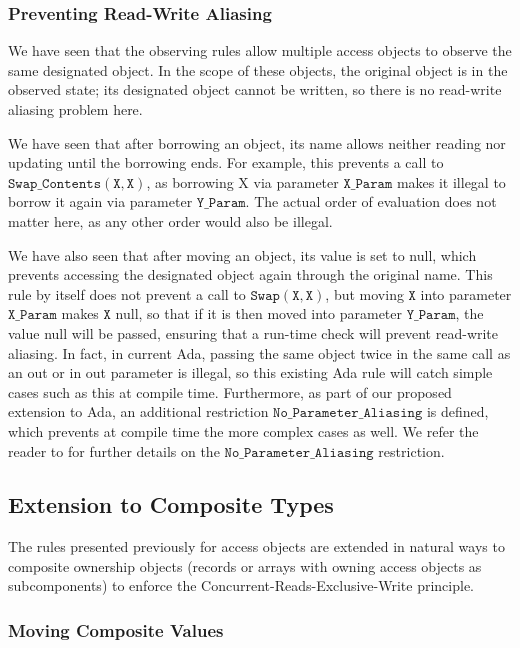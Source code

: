 \documentclass[runningheads]{llncs}
\newcommand\var[1]{\ensuremath{\mathtt{#1}}}
\newcommand{\keyword}[1]{\textsf{#1}}
\begin{document}
\subsubsection{Preventing Read-Write Aliasing}
\label{sec:noaliasing}

We have seen that the observing rules allow multiple access objects to observe the same designated object. In the scope of these objects, the original object is in the observed state; its designated object
cannot be written, so there is no read-write aliasing problem here.


We have seen that after borrowing an object, its name allows neither reading nor updating until the borrowing ends. For example, this prevents a call to \var{Swap\_Contents (X, X)},
as borrowing X via parameter \var{X\_Param} makes it illegal to borrow it again via parameter \var{Y\_Param}. The actual order of evaluation does not matter here, as any other order would also be illegal.


We have also seen that after moving an object, its value is set to null, which prevents accessing the designated object again through the original name.
This rule by itself does not prevent a call to \var{Swap(X, X)}, but moving \var{X} into parameter \var{X\_Param} makes \var{X} null, so that if it is then moved into parameter \var{Y\_Param}, the value null will be passed, ensuring
that a run-time check will prevent read-write aliasing.   In fact, in current Ada, passing the same object twice in the same call as an \keyword{out} or \keyword{in out} parameter is illegal, so this existing Ada rule will catch simple cases such as this at compile time.
Furthermore, as part of our proposed
extension to Ada, an additional restriction \var{No\_Parameter\_Aliasing} is defined,
which prevents at compile time the more complex cases as well. We refer the reader to \cite{AI2018} for further details on the \var{No\_Parameter\_Aliasing} restriction.


\subsection{Extension to Composite Types}
\label{subsec:ownershipComposite}

The rules presented previously for access objects are extended in natural ways to composite ownership objects (records or arrays with owning access objects as subcomponents) to enforce the Concurrent-Reads-Exclusive-Write principle.

\subsubsection{Moving Composite Values}
\label{subsubsec:movingComposite}
\end{document}
